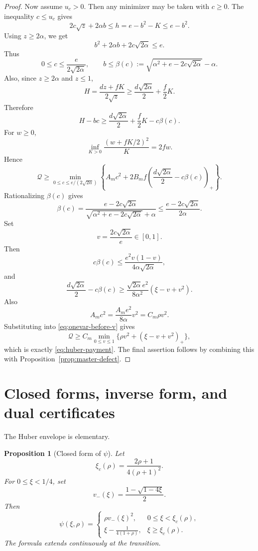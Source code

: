 \documentclass[11pt]{article}
\newtheorem{proposition}[theorem]{Proposition}
\newcommand{\cQ}{\mathcal Q}
\newcommand{\pos}[1]{\left(#1\right)_{+}}
\begin{document}
\begin{proof}
Now assume $u_c>0$.  Then any minimizer may be taken with $c\ge0$.
The inequality $c\le u_c$ gives
\[
        2c\sqrt z+2\alpha b\le h=e-b^2-K\le e-b^2.
\]
Using $z\ge2\alpha$, we get
\begin{equation}\label{eq:b-c-budget}
        b^2+2\alpha b+2c\sqrt{2\alpha}\le e.
\end{equation}
Thus
\[
        0\le c\le\frac{e}{2\sqrt{2\alpha}},
        \qquad
        b\le\beta(c):=
        \sqrt{\alpha^2+e-2c\sqrt{2\alpha}}-\alpha.
\]
Also, since $z\ge2\alpha$ and $z\le1$,
\[
        H=\frac{dz+fK}{2\sqrt z}
        \ge \frac{d\sqrt{2\alpha}}2+\frac f2K.
\]
Therefore
\[
        H-bc\ge
        \frac{d\sqrt{2\alpha}}2+\frac f2K-c\beta(c).
\]
For $w\ge0$,
\[
        \inf_{K>0}\frac{(w+fK/2)^2}{K}=2fw.
\]
Hence
\begin{equation}\label{eq:onevar-before-v}
        \cQ\ge
        \min_{0\le c\le e/(2\sqrt{2\alpha})}
        \left\{
        A_m c^2+2B_mf\pos{\frac{d\sqrt{2\alpha}}2-c\beta(c)}
        \right\}.
\end{equation}
Rationalizing $\beta(c)$ gives
\[
        \beta(c)=
        \frac{e-2c\sqrt{2\alpha}}
        {\sqrt{\alpha^2+e-2c\sqrt{2\alpha}}+\alpha}
        \le
        \frac{e-2c\sqrt{2\alpha}}{2\alpha}.
\]
Set
\[
        v=\frac{2c\sqrt{2\alpha}}e\in[0,1].
\]
Then
\[
        c\beta(c)
        \le
        \frac{e^2v(1-v)}{4\alpha\sqrt{2\alpha}},
\]
and
\[
        \frac{d\sqrt{2\alpha}}2-c\beta(c)
        \ge
        \frac{\sqrt{2\alpha}e^2}{8\alpha^2}
        (\xi-v+v^2).
\]
Also
\[
        A_mc^2=\frac{A_me^2}{8\alpha}v^2=C_m\rho v^2.
\]
Substituting into \eqref{eq:onevar-before-v} gives
\[
        \cQ\ge C_m
        \min_{0\le v\le1}\{\rho v^2+\pos{\xi-v+v^2}\},
\]
which is exactly \eqref{eq:huber-payment}.
The final assertion follows by combining this with
Proposition~\ref{prop:master-defect}.
\end{proof}

\section{Closed forms, inverse form, and dual certificates}

The Huber envelope is elementary.

\begin{proposition}[Closed form of $\psi$]\label{prop:psi-closed}
Let
\[
        \xi_c(\rho)=\frac{2\rho+1}{4(\rho+1)^2}.
\]
For $0\le\xi<1/4$, set
\[
        v_-(\xi)=\frac{1-\sqrt{1-4\xi}}2.
\]
Then
\begin{equation}\label{eq:psi-closed}
        \psi(\xi,\rho)=
        \begin{cases}
        \rho v_-(\xi)^2,
        &0\le\xi<\xi_c(\rho),\\[2mm]
        \displaystyle \xi-\frac1{4(1+\rho)},
        &\xi\ge\xi_c(\rho).
        \end{cases}
\end{equation}
The formula extends continuously at the transition.
\end{proposition}
\end{document}

